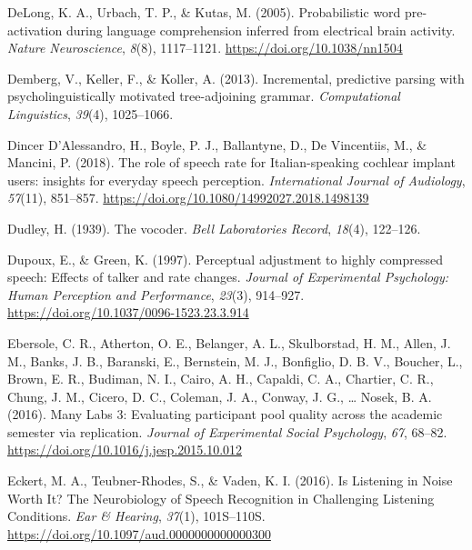 \documentclass[a4paper, nobind]{templates/ociamthesis}
\newlength{\cslhangindent}
\newenvironment{CSLReferences}[2] %
 {%
  \setlength{\parindent}{0pt}
  \ifodd #1
  \let\oldpar\par
  \def\par{\hangindent=\cslhangindent\oldpar}
  \fi
  \setlength{\parskip}{1mm}
  \setlength{\baselineskip}{6mm}
 }%
 {}
\begin{document}
\begin{CSLReferences}{1}{0}
\leavevmode{}%
DeLong, K. A., Urbach, T. P., \& Kutas, M. (2005). Probabilistic word pre-activation during language comprehension inferred from electrical brain activity. \emph{Nature Neuroscience}, \emph{8}(8), 1117--1121. \url{https://doi.org/10.1038/nn1504}

\leavevmode{}%
Demberg, V., Keller, F., \& Koller, A. (2013). Incremental, predictive parsing with psycholinguistically motivated tree-adjoining grammar. \emph{Computational Linguistics}, \emph{39}(4), 1025--1066.

\leavevmode{}%
Dincer D'Alessandro, H., Boyle, P. J., Ballantyne, D., De Vincentiis, M., \& Mancini, P. (2018). {The role of speech rate for Italian-speaking cochlear implant users: insights for everyday speech perception}. \emph{International Journal of Audiology}, \emph{57}(11), 851--857. \url{https://doi.org/10.1080/14992027.2018.1498139}

\leavevmode{}%
Dudley, H. (1939). {The vocoder}. \emph{Bell Laboratories Record}, \emph{18}(4), 122--126.

\leavevmode{}%
Dupoux, E., \& Green, K. (1997). Perceptual adjustment to highly compressed speech: Effects of talker and rate changes. \emph{Journal of Experimental Psychology: Human Perception and Performance}, \emph{23}(3), 914--927. \url{https://doi.org/10.1037/0096-1523.23.3.914}

\leavevmode{}%
Ebersole, C. R., Atherton, O. E., Belanger, A. L., Skulborstad, H. M., Allen, J. M., Banks, J. B., Baranski, E., Bernstein, M. J., Bonfiglio, D. B. V., Boucher, L., Brown, E. R., Budiman, N. I., Cairo, A. H., Capaldi, C. A., Chartier, C. R., Chung, J. M., Cicero, D. C., Coleman, J. A., Conway, J. G., \ldots{} Nosek, B. A. (2016). {Many Labs 3: Evaluating participant pool quality across the academic semester via replication}. \emph{Journal of Experimental Social Psychology}, \emph{67}, 68--82. \url{https://doi.org/10.1016/j.jesp.2015.10.012}

\leavevmode{}%
Eckert, M. A., Teubner-Rhodes, S., \& Vaden, K. I. (2016). Is Listening in Noise Worth It? The Neurobiology of Speech Recognition in Challenging Listening Conditions. \emph{Ear \& Hearing}, \emph{37}(1), 101S--110S. \url{https://doi.org/10.1097/aud.0000000000000300}


\end{CSLReferences}
\end{document}
